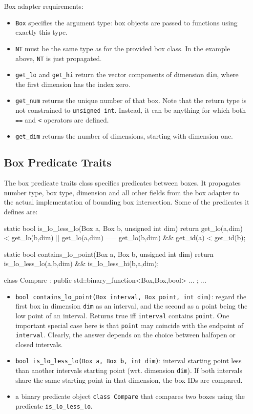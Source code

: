 Box adapter requirements:
\begin{itemize}
 \item \texttt{Box} specifies the argument type: box objects are passed to functions using exactly this type.
 \item \texttt{NT} must be the same type as for the provided box class. In the example above, \texttt{NT} is just propagated.
 \item \texttt{get\_lo} and \texttt{get\_hi} return the vector components of dimension \texttt{dim}, where the first  dimension has the index zero.
 \item \texttt{get\_num} returns the unique number of that box. Note that the return type is not constrained to \texttt{unsigned int}. Instead, it can be anything for which both \texttt{==} and \texttt{<} operators are defined.
 \item \texttt{get\_dim} returns the number of dimensions, starting with dimension one.
\end{itemize}

\subsection*{Box Predicate Traits}
The box predicate traits class specifies predicates between boxes. It propagates number type, box type, dimension and all other fields from the box adapter to the actual implementation of bounding box intersection. Some of the predicates it defines are:
\begin{ccExampleCode}
    static bool is_lo_less_lo(Box a, Box b, unsigned int dim) {
        return get_lo(a,dim)  < get_lo(b,dim) ||
               get_lo(a,dim) == get_lo(b,dim) && get_id(a) < get_id(b);
    }

    static bool contains_lo_point(Box a, Box b, unsigned int dim)
    { return is_lo_less_lo(a,b,dim) && is_lo_less_hi(b,a,dim);  }

    class Compare : public std::binary_function<Box,Box,bool> { ... };
    ...
\end{ccExampleCode}

\begin{itemize}
 \item \texttt{bool contains\_lo\_point(Box interval, Box point, int dim)}: regard the first box in dimension \texttt{dim} as an interval, and the second as a point being the low point of an interval. Returns true iff \texttt{interval} contains \texttt{point}. One important special case here is that \texttt{point} may coincide with the endpoint of \texttt{interval}. Clearly, the answer depends on the choice between halfopen or closed intervals.
 \item \texttt{bool is\_lo\_less\_lo(Box a, Box b, int dim)}: interval starting point less than another intervals starting point (wrt. dimension \texttt{dim}). If both intervals share the same starting point in that dimension, the box IDs are compared.
 \item a binary predicate object \texttt{class Compare} that compares two boxes using the predicate \texttt{is\_lo\_less\_lo}.
\end{itemize}

